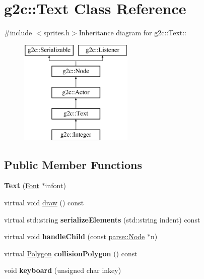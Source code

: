 \hypertarget{classg2c_1_1_text}{
\section{g2c::Text Class Reference}
\label{classg2c_1_1_text}
}


{\ttfamily \#include $<$sprites.h$>$}Inheritance diagram for g2c::Text::\begin{figure}[H]
\begin{center}
\leavevmode
\includegraphics[height=5cm]{classg2c_1_1_text}
\end{center}
\end{figure}
\subsection*{Public Member Functions}
\begin{DoxyCompactItemize}
\item 
\hypertarget{classg2c_1_1_text_a58370a00a8812fe81985cd69bc25c163}{
{\bfseries Text} (\hyperlink{classg2c_1_1_font}{Font} $\ast$infont)}
\label{classg2c_1_1_text_a58370a00a8812fe81985cd69bc25c163}

\item 
virtual void \hyperlink{classg2c_1_1_text_ab3296a30652c4c3157ae8a8e87449bb4}{draw} () const 
\item 
\hypertarget{classg2c_1_1_text_a707929240f4ecc9113345c8128b2a749}{
virtual std::string {\bfseries serializeElements} (std::string indent) const }
\label{classg2c_1_1_text_a707929240f4ecc9113345c8128b2a749}

\item 
\hypertarget{classg2c_1_1_text_abd97b62c5a137c4410673fa8f798202f}{
virtual void {\bfseries handleChild} (const \hyperlink{classparse_1_1_node}{parse::Node} $\ast$n)}
\label{classg2c_1_1_text_abd97b62c5a137c4410673fa8f798202f}

\item 
\hypertarget{classg2c_1_1_text_a8a68d2f6ac6251a5ba158f3d7dbf0e2e}{
virtual \hyperlink{classg2c_1_1_polygon}{Polygon} {\bfseries collisionPolygon} () const }
\label{classg2c_1_1_text_a8a68d2f6ac6251a5ba158f3d7dbf0e2e}

\item 
\hypertarget{classg2c_1_1_text_ac78497d459bbece12e7a3bbd2fb877f5}{
void {\bfseries keyboard} (unsigned char inkey)}
\label{classg2c_1_1_text_ac78497d459bbece12e7a3bbd2fb877f5}

\end{DoxyCompactItemize}
